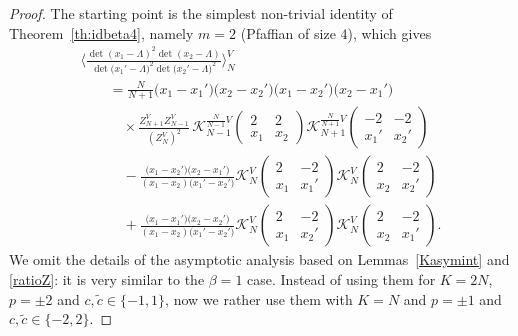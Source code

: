 \documentclass[pdftex]{sigma}
\numberwithin{equation}{section}
\begin{document}
\begin{proof}\allowdisplaybreaks
The starting point is the simplest non-trivial identity of Theorem~\ref{th:idbeta4}, namely $m = 2$ (Pfaffian of size $4$), which gives
\begin{gather*}
 \Biggl\langle\frac{\det(x_1 - \Lambda)^2\det(x_2 - \Lambda)}{\det\bigl(x_1' - \Lambda\bigr)^2\det\bigl(x_2' - \Lambda\bigr)^2}\Biggr\rangle_{N}^{V} \\
 \qquad{}= \frac{N}{N + 1}\bigl(x_1 - x_1'\bigr)\bigl(x_2 - x_2'\bigr)\bigl(x_1 - x_2'\bigr)\bigl(x_2 - x_1'\bigr) \\
 \qquad\quad{}\times  \frac{Z_{N + 1}^{V}Z_{N - 1}^{V}}{(Z_N^V)^2}\,\mathcal{K}_{N - 1}^{\frac{N}{N - 1}V}\left(\begin{matrix} 2 & 2 \\ x_1 & x_2 \end{matrix}\right)\mathcal{K}_{N + 1}^{\frac{N}{N + 1}V}\left(\begin{matrix} -2 & -2 \\ x_1' & x_2' \end{matrix}\right) \\
\qquad\quad{} - \frac{\bigl(x_1 - x_2'\bigr)\bigl(x_2 - x_1'\bigr)}{(x_1 - x_2)\bigl(x_1' - x_2'\bigr)} \mathcal{K}_{N}^{V}\left(\begin{matrix} 2 & -2 \\ x_1 & x_1' \end{matrix}\right)\mathcal{K}_{N}^{V}\left(\begin{matrix} 2 & -2 \\ x_2 & x_2' \end{matrix}\right) \\
\qquad\quad{}
 + \frac{\bigl(x_1 - x_1'\bigr)\bigl(x_2 - x_2'\bigr)}{(x_1 - x_2)\bigl(x_1' - x_2'\bigr)} \mathcal{K}_{N}^{V}\left(\begin{matrix} 2 & -2 \\ x_1 & x_2' \end{matrix}\right)\mathcal{K}_N^{V}\left(\begin{matrix} 2 & -2 \\ x_2 & x_1' \end{matrix}\right).
\end{gather*}
We omit the details of the asymptotic analysis based on Lemmas~\ref{Kasymint} and \ref{ratioZ}: it is very similar to the $\beta = 1$ case. Instead of using them for $K = 2N$, $p = \pm 2$ and $c,\tilde{c} \in \{-1,1\}$, now we rather use them with $K = N$ and $p = \pm 1$ and $c,\tilde{c} \in \{- 2,2\}$.
\end{proof}
\end{document}
